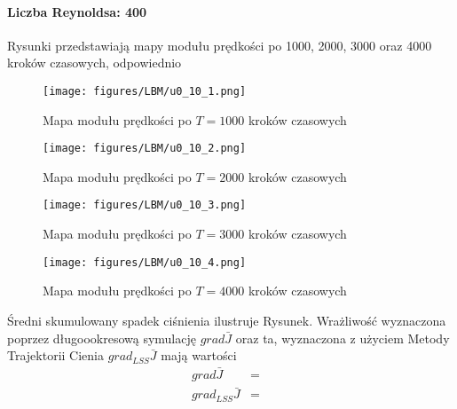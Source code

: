 \documentclass[12pt]{article}
\begin{document}
\paragraph{Liczba Reynoldsa: 400}
Rysunki przedstawiają mapy modułu prędkości po 1000, 2000, 3000 oraz 4000 kroków czasowych, odpowiednio 
\begin{figure}[H]
	\texttt{[image: figures/LBM/u0\_10\_1.png]} 
	\caption{Mapa modułu prędkości po $ T=1000 $ kroków czasowych}
\end{figure}
\begin{figure}[H]
	\texttt{[image: figures/LBM/u0\_10\_2.png]} 
	\caption{Mapa modułu prędkości po $ T=2000 $ kroków czasowych}
\end{figure}
\begin{figure}[H]
	\texttt{[image: figures/LBM/u0\_10\_3.png]} 
	\caption{Mapa modułu prędkości po $ T=3000 $ kroków czasowych}
\end{figure}
\begin{figure}[H]
	\texttt{[image: figures/LBM/u0\_10\_4.png]} 
	\caption{Mapa modułu prędkości po $ T=4000 $ kroków czasowych}
\end{figure}
Średni skumulowany spadek ciśnienia ilustruje Rysunek.
Wrażliwość wyznaczona poprzez długoookresową symulację $ grad\bar{J} $ oraz ta, wyznaczona z użyciem Metody Trajektorii Cienia $ grad_{LSS}\bar{J} $ mają wartości
\begin{equation}
\begin{array}{rcl}
grad\bar{J} &=& \\
grad_{LSS}\bar{J} &=& 
\end{array} 
\label{result400}
\end{equation}
\end{document}

